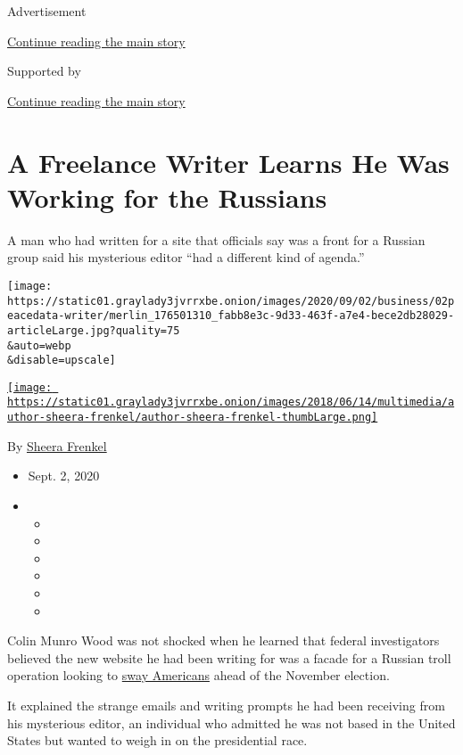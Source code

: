 Advertisement

\protect\hyperlink{after-top}{Continue reading the main story}

Supported by

\protect\hyperlink{after-sponsor}{Continue reading the main story}

\hypertarget{a-freelance-writer-learns-he-was-working-for-the-russians}{%
\section{A Freelance Writer Learns He Was Working for the
Russians}\label{a-freelance-writer-learns-he-was-working-for-the-russians}}

A man who had written for a site that officials say was a front for a
Russian group said his mysterious editor ``had a different kind of
agenda.''

\texttt{[image: https://static01.graylady3jvrrxbe.onion/images/2020/09/02/business/02peacedata-writer/merlin\_176501310\_fabb8e3c-9d33-463f-a7e4-bece2db28029-articleLarge.jpg?quality=75\\\&auto=webp\\\&disable=upscale]}

\href{https://www.nytimes3xbfgragh.onion/by/sheera-frenkel}{\texttt{[image: https://static01.graylady3jvrrxbe.onion/images/2018/06/14/multimedia/author-sheera-frenkel/author-sheera-frenkel-thumbLarge.png]}}

By \href{https://www.nytimes3xbfgragh.onion/by/sheera-frenkel}{Sheera
Frenkel}

\begin{itemize}
\item
  Sept. 2, 2020
\item
  \begin{itemize}
  \item
  \item
  \item
  \item
  \item
  \item
  \end{itemize}
\end{itemize}

Colin Munro Wood was not shocked when he learned that federal
investigators believed the new website he had been writing for was a
facade for a Russian troll operation looking to
\href{https://www.nytimes3xbfgragh.onion/2020/08/05/us/politics/state-department-russian-disinformation.html}{sway
Americans} ahead of the November election.

It explained the strange emails and writing prompts he had been
receiving from his mysterious editor, an individual who admitted he was
not based in the United States but wanted to weigh in on the
presidential race.

